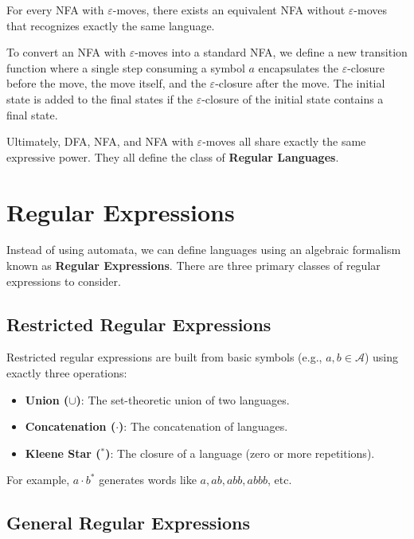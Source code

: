 \begin{theorem}
For every NFA with $\varepsilon$-moves, there exists an equivalent NFA without $\varepsilon$-moves that recognizes exactly the same language.
\end{theorem}

To convert an NFA with $\varepsilon$-moves into a standard NFA, we define a new transition function where a single step consuming a symbol $a$ encapsulates the $\varepsilon$-closure before the move, the move itself, and the $\varepsilon$-closure after the move. The initial state is added to the final states if the $\varepsilon$-closure of the initial state contains a final state.

Ultimately, DFA, NFA, and NFA with $\varepsilon$-moves all share exactly the same expressive power. They all define the class of \textbf{Regular Languages}.

\section{Regular Expressions}

Instead of using automata, we can define languages using an algebraic formalism known as \textbf{Regular Expressions}. There are three primary classes of regular expressions to consider.

\subsection{Restricted Regular Expressions}

Restricted regular expressions are built from basic symbols (e.g., $a, b \in \mathcal{A}$) using exactly three operations:
\begin{itemize}
\item \textbf{Union ($\cup$)}: The set-theoretic union of two languages.
\item \textbf{Concatenation ($\cdot$)}: The concatenation of languages.
\item \textbf{Kleene Star ($^*$)}: The closure of a language (zero or more repetitions).
\end{itemize}

For example, $a \cdot b^*$ generates words like $a, ab, abb, abbb$, etc.

\subsection{General Regular Expressions}

